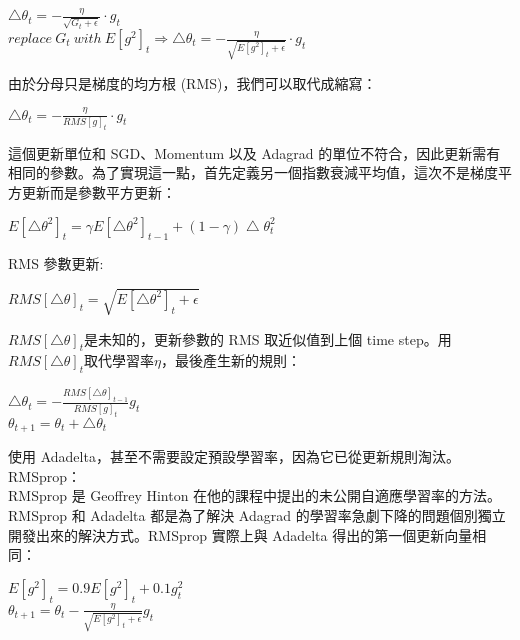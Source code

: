 \begin{itemize}
\begin{center}
$\bigtriangleup\theta_t=-\frac{\eta}{\sqrt{G_t+\epsilon}}\cdot g_t$\\
$replace\ G_t\ with\ E[g^2]_t\Rightarrow\bigtriangleup\theta_t=-\frac{\eta}{\sqrt{E[g^2]_t+\epsilon}}\cdot g_t$
\end{center}
由於分母只是梯度的均方根 (RMS)，我們可以取代成縮寫：
\begin{center}
$\bigtriangleup\theta_t=-\frac{\eta}{RMS[g]_t}\cdot g_t$
\end{center}
 這個更新單位和 SGD、Momentum 以及 Adagrad 的單位不符合，因此更新需有相同的參數。為了實現這一點，首先定義另一個指數衰減平均值，這次不是梯度平方更新而是參數平方更新：
\begin{center}
$E[\bigtriangleup\theta^2]_t=\gamma E[\bigtriangleup\theta^2]_{t-1}+(1-\gamma)\bigtriangleup\theta^2 _t$
\end{center}
RMS 參數更新:
\begin{center}
$RMS[\bigtriangleup\theta]_t=\sqrt{E[\bigtriangleup\theta^2]_t+\epsilon}$
\end{center}
$RMS[\bigtriangleup\theta]_t$是未知的，更新參數的 RMS 取近似值到上個 time step。用$RMS[\bigtriangleup\theta]_t$取代學習率$\eta$，最後產生新的規則：
\begin{center}
$\bigtriangleup\theta_t=-\frac{RMS[\bigtriangleup\theta]_{t-1}}{RMS[g]_t}g_t$
\\
$\theta_{t+1}=\theta_t+\bigtriangleup\theta_t$
\end{center}
使用 Adadelta，甚至不需要設定預設學習率，因為它已從更新規則淘汰。\\
RMSprop：\\
 RMSprop 是 Geoffrey Hinton 在他的課程中提出的未公開自適應學習率的方法。\\

 RMSprop 和 Adadelta 都是為了解決 Adagrad 的學習率急劇下降的問題個別獨立開發出來的解決方式。RMSprop 實際上與 Adadelta 得出的第一個更新向量相同：
\begin{center}
$E[g^2]_t=0.9E[g^2]_t+0.1g^2 _t$
\\
$\theta_{t+1}=\theta_t-\frac{\eta}{\sqrt{E[g^2]_t+\epsilon}}g_t$
\end{center}


\end{itemize}
